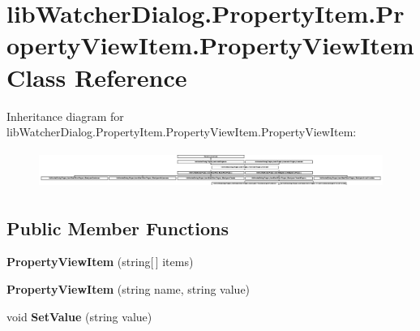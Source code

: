 \hypertarget{classlib_watcher_dialog_1_1_property_item_1_1_property_view_item_1_1_property_view_item}{\section{lib\+Watcher\+Dialog.\+Property\+Item.\+Property\+View\+Item.\+Property\+View\+Item Class Reference}
\label{classlib_watcher_dialog_1_1_property_item_1_1_property_view_item_1_1_property_view_item}
}
Inheritance diagram for lib\+Watcher\+Dialog.\+Property\+Item.\+Property\+View\+Item.\+Property\+View\+Item\+:\begin{figure}[H]
\begin{center}
\leavevmode
\includegraphics[height=1.215190cm]{classlib_watcher_dialog_1_1_property_item_1_1_property_view_item_1_1_property_view_item}
\end{center}
\end{figure}
\subsection*{Public Member Functions}
\begin{DoxyCompactItemize}
\item 
\hypertarget{classlib_watcher_dialog_1_1_property_item_1_1_property_view_item_1_1_property_view_item_a16877cf367d9f606e7bdac527f999ab6}{{\bfseries Property\+View\+Item} (string\mbox{[}$\,$\mbox{]} items)}\label{classlib_watcher_dialog_1_1_property_item_1_1_property_view_item_1_1_property_view_item_a16877cf367d9f606e7bdac527f999ab6}

\item 
\hypertarget{classlib_watcher_dialog_1_1_property_item_1_1_property_view_item_1_1_property_view_item_a4ed94dcccc3ab5857ab3bcec8b8200d1}{{\bfseries Property\+View\+Item} (string name, string value)}\label{classlib_watcher_dialog_1_1_property_item_1_1_property_view_item_1_1_property_view_item_a4ed94dcccc3ab5857ab3bcec8b8200d1}

\item 
\hypertarget{classlib_watcher_dialog_1_1_property_item_1_1_property_view_item_1_1_property_view_item_ad14782e5fbdbc4285303ae601ebc2407}{void {\bfseries Set\+Value} (string value)}\label{classlib_watcher_dialog_1_1_property_item_1_1_property_view_item_1_1_property_view_item_ad14782e5fbdbc4285303ae601ebc2407}

\end{DoxyCompactItemize}
